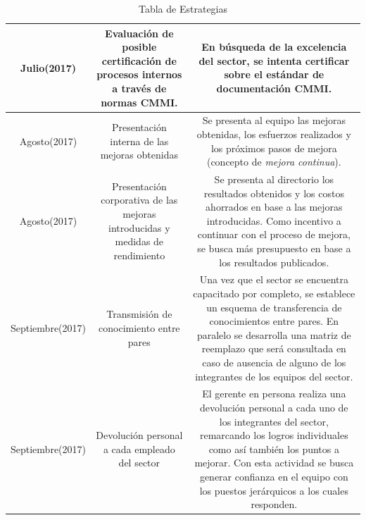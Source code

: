 \begin{table}
{\begin{tabular}{|c|c|c|}
Julio(2017)                                                                                                             & Evaluación de posible certificación de procesos internos a través de normas CMMI.                         & En búsqueda de la excelencia del sector, se intenta certificar sobre el estándar de documentación CMMI.                                                                                                                                                                                                \\ \hline
Agosto(2017)                                                                                                            & Presentación interna de las mejoras obtenidas                                                             & Se presenta al equipo las mejoras obtenidas, los esfuerzos realizados y los próximos pasos de mejora (concepto de \textit{mejora continua}).                                                                                                                                                                     \\ \hline
Agosto(2017)                                                                                                            & Presentación corporativa de las mejoras introducidas y medidas de rendimiento                            & Se presenta al directorio los resultados obtenidos y los costos ahorrados en base a las mejoras introducidas. Como incentivo a continuar con el proceso de mejora, se busca más presupuesto en base a los resultados publicados.                                                                        \\ \hline
Septiembre(2017)                                                                                                        & Transmisión de conocimiento entre pares                                                                  & Una vez que el sector se encuentra capacitado por completo, se establece un esquema de transferencia de conocimientos entre pares. En paralelo se desarrolla una matriz de reemplazo que será consultada en caso de ausencia de alguno de los integrantes de los equipos del sector.                   \\ \hline
Septiembre(2017)                                                                                                        & Devolución personal a cada empleado del sector                                                           & El gerente en persona realiza una devolución personal a cada uno de los integrantes del sector, remarcando los logros individuales como así también los puntos a mejorar. Con esta actividad se busca generar confianza en el equipo con los puestos jerárquicos a los cuales responden.               \\ \hline
\end{tabular}
}
\caption{Tabla de Estrategias}
\label{estrategias}
\end{table}

